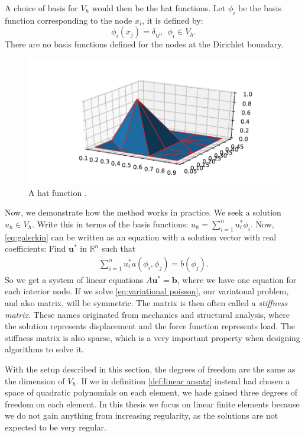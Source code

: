 \documentclass[../Main/main.tex]{subfiles}
\begin{document}
	A choice of basis for $V_h$ would then be the hat functions.  Let $\phi_i$ be the basis function corresponding to the node $x_i$, it is defined by:
	\begin{equation*}
		\phi_i(x_j) = \delta_{ij}, \ \ \phi_i \in V_h.
	\end{equation*}
	There are no basis functions defined for the nodes at the Dirichlet boundary.
	\begin{figure}[H]
		\centering
		\includegraphics[width=1\textwidth]{hat1.pdf}
		\caption{A hat function .}
		\label{fig:hat1}
	\end{figure}
	Now, we demonstrate how the method works in practice. We seek a solution $u_h \in V_h$. Write this in terms of the basis functions: $u_h = \sum_{i=1}^n u_i^* \phi_i$. Now, \eqref{eq:galerkin} can be written as an equation with a solution vector with real coefficients: Find $\pmb{u}^*$ in $\mathbb{R}^n$ such that
	\begin{equation}\label{eq:fem system}
		\begin{gathered}
			\sum_{i=1}^n u_i^*  a(\phi_i,\phi_j) = b(\phi_j).
		\end{gathered}
	\end{equation}
	So we get a system of linear equations $A\pmb{u}^* = \pmb{b}$, where we have one equation for each interior node. If we solve \eqref{eq:variational poisson}, our variatonal problem, and also matrix, will be symmetric. The matrix is then often called a \emph{stiffness matrix}. These names originated from mechanics and structural analysis, where the solution represents displacement and the force function represents load. The stiffness matrix is also sparse, which is a very important property when designing algorithms to solve it.\par
	With the setup described in this section, the degrees of freedom are the same as the dimension of $V_h$. If we in definition \ref{def:linear ansatz} instead had chosen a space of quadratic polynomials on each element, we hade gained three degrees of freedom on each element. In this thesis we focus on linear finite elements because we do not gain anything from increasing regularity, as the solutions are not expected to be very regular. 
\end{document}
